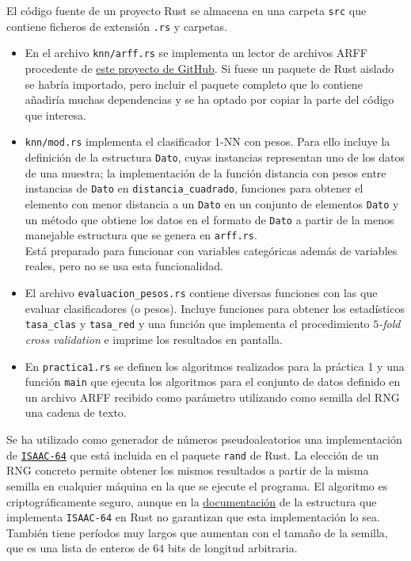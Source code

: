 \documentclass{article}
\begin{document}
El código fuente de un proyecto Rust se almacena en una carpeta \texttt{src} que contiene ficheros de extensión \texttt{.rs} y carpetas.

\begin{itemize}
	\item En el archivo \texttt{knn/arff.rs} se implementa un lector de archivos ARFF procedente de \href{https://github.com/gyscos/varf}{este proyecto de GitHub}. Si fuese un paquete de Rust aislado se habría importado, pero incluir el paquete completo que lo contiene añadiría muchas dependencias y se ha optado por copiar la parte del código que interesa.
	\item \texttt{knn/mod.rs} implementa el clasificador 1-NN con pesos. Para ello incluye la definición de la estructura \texttt{Dato}, cuyas instancias representan uno de los datos de una muestra; la implementación de la función distancia con pesos entre instancias de \texttt{Dato} en \texttt{distancia\_cuadrado}, funciones para obtener el elemento con menor distancia a un \texttt{Dato} en un conjunto de elementos \texttt{Dato} y un método que obtiene los datos en el formato de \texttt{Dato} a partir de la menos manejable estructura que se genera en \texttt{arff.rs}. \\ Está preparado para funcionar con variables categóricas además de variables reales, pero no se usa esta funcionalidad.
	\item El archivo \texttt{evaluacion\_pesos.rs} contiene diversas funciones con las que evaluar clasificadores (o pesos). Incluye funciones para obtener los estadísticos \texttt{tasa\_clas} y \texttt{tasa\_red} y una función que implementa el procedimiento \textit{$5$-fold cross validation} e imprime los resultados en pantalla.
	\item En \texttt{practica1.rs} se definen los algoritmos realizados para la práctica 1 y una función \texttt{main} que ejecuta los algoritmos para el conjunto de datos definido en un archivo ARFF recibido como parámetro utilizando como semilla del RNG una cadena de texto.
\end{itemize}

Se ha utilizado como generador de números pseudoaleatorios una implementación de \href{http://www.burtleburtle.net/bob/rand/isaac.html}{\texttt{ISAAC-64}} que está incluida en el paquete \texttt{rand} de Rust. La elección de un RNG concreto permite obtener los mismos resultados a partir de la misma semilla en cualquier máquina en la que se ejecute el programa. El algoritmo es criptográficamente seguro, aunque en la \href{https://docs.rs/rand/0.4.2/rand/struct.Isaac64Rng.html}{documentación} de la estructura que implementa \texttt{ISAAC-64} en Rust no garantizan que esta implementación lo sea. También tiene períodos muy largos que aumentan con el tamaño de la semilla, que es una lista de enteros de $64$ bits de longitud arbitraria.
\end{document}
